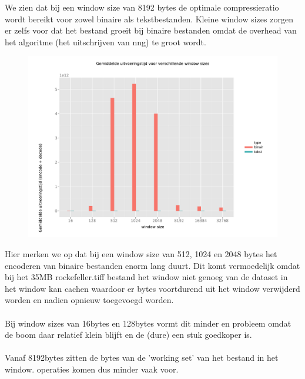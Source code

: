 \documentclass[a4paper,12pt]{report}
\begin{document}
We zien dat bij een window size van 8192 bytes de optimale compressieratio wordt bereikt voor zowel binaire als tekstbestanden. Kleine window sizes zorgen er zelfs voor dat het bestand groeit bij binaire bestanden omdat de overhead van het algoritme (het uitschrijven van nng) te groot wordt.

\begin{figure}[H]
	\includegraphics[scale=.6]{../experimenten/window_avg_time}
\end{figure}
Hier merken we op dat bij een window size van 512, 1024 en 2048 bytes het encoderen van binaire bestanden enorm lang duurt. Dit komt vermoedelijk omdat bij het 35MB rockefeller.tiff bestand het window niet genoeg van de dataset in het window kan cachen waardoor er bytes voortdurend uit het window verwijderd worden en nadien opnieuw toegevoegd worden. \\ \\
Bij window sizes van 16bytes en 128bytes vormt dit minder en probleem omdat de boom daar relatief klein blijft en de (dure)  een stuk goedkoper is. \\ \\
Vanaf 8192bytes zitten de bytes van de 'working set' van het bestand in het window.  operaties komen dus minder vaak voor.
\end{document}
